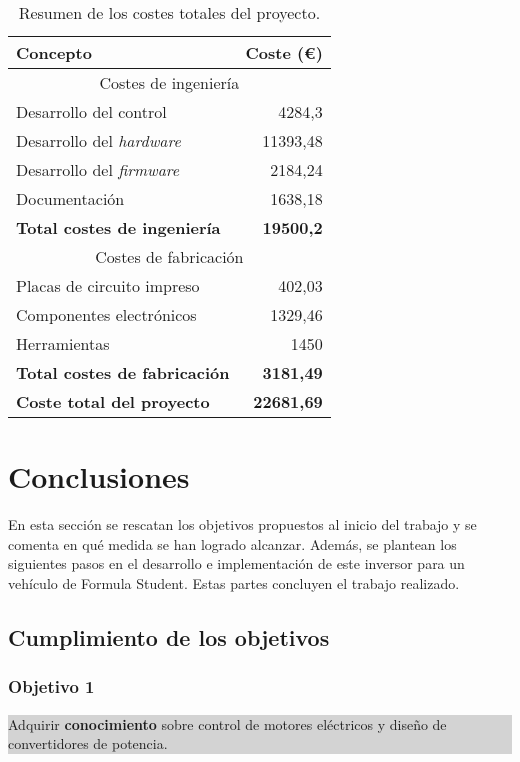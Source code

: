 \begin{table}[H]
	\centering
	\begin{tabular}{|l|r|}
		\hline
		\textbf{Concepto} & \textbf{Coste (\euro{})} \\
		\hline
		\multicolumn{2}{|c|}{Costes de ingeniería} \\
		\hline
		Desarrollo del control & 4284,3 \\
		Desarrollo del \textit{hardware} & 11393,48 \\
		Desarrollo del \textit{firmware} & 2184,24 \\
		Documentación & 1638,18 \\
		\hline
		\textbf{Total costes de ingeniería} & \textbf{19500,2} \\
		\hline
		\multicolumn{2}{|c|}{Costes de fabricación} \\
		\hline
		Placas de circuito impreso & 402,03 \\
		Componentes electrónicos & 1329,46 \\
		Herramientas & 1450 \\
		\hline
		\textbf{Total costes de fabricación} & \textbf{3181,49} \\
		\hline
		\textbf{Coste total del proyecto} & \textbf{22681,69} \\
		\hline
	\end{tabular}
	\caption{Resumen de los costes totales del proyecto.}
\end{table}


\newpage
\section*{Conclusiones}

En esta sección se rescatan los objetivos propuestos al inicio del trabajo y se comenta en qué medida se han logrado alcanzar. Además, se plantean los siguientes pasos en el desarrollo e implementación de este inversor para un vehículo de Formula Student. Estas partes concluyen el trabajo realizado.

\subsection*{Cumplimiento de los objetivos}

\subsubsection*{Objetivo 1}
\colorbox{lightgray}{%
	\parbox{\dimexpr\linewidth-2\fboxsep-2\fboxrule}{%
		Adquirir \textbf{conocimiento} sobre control de motores eléctricos y diseño de convertidores de potencia.%
	}%
}

